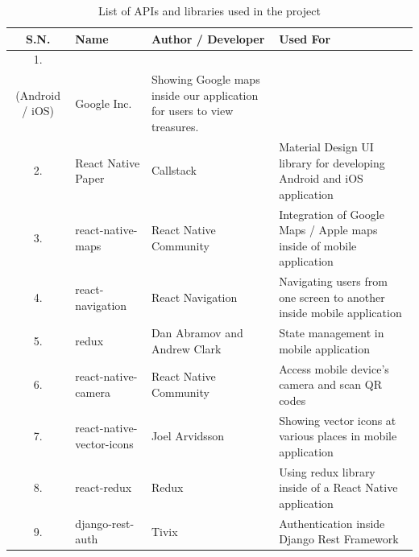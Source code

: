 \documentclass[12pt, a4paper, oneside]{article}
\begin{document}
\begin{table}[H]
\begin{tabularx}{\linewidth}{|c|X|X|X|}
\hline
\rowcolor[HTML]{C0C0C0} 
{\color[HTML]{000000} S.N.} & {\color[HTML]{000000} Name}                                               & {\color[HTML]{000000} Author / Developer} & {\color[HTML]{000000} Used For}                                         \\ \hline
1.                          & \begin{tabular}[c]{@{}l@{}}Google Maps SDK\\ (Android / iOS)\end{tabular} & Google Inc.                                            & Showing Google maps inside our application for users to view treasures. \\ \hline
2.                          & React Native Paper                                                        & Callstack                                              & Material Design UI library for developing Android and iOS application   \\ \hline
3.                          & react-native-maps                                                         & React Native Community                                 & Integration of Google Maps / Apple maps inside of mobile application    \\ \hline
4.                          & react-navigation                                                          & React Navigation                                       & Navigating users from one screen to another inside mobile application   \\ \hline
5.                          & redux                                                                     & Dan Abramov and Andrew Clark                           & State management in mobile application                                  \\ \hline
6.                          & react-native-camera                                                       & React Native Community                                 & Access mobile device's camera and scan QR codes                         \\ \hline
7.                          & react-native-vector-icons                                                 & Joel Arvidsson                                         & Showing vector icons at various places in mobile application            \\ \hline
8.                          & react-redux                                                               & Redux                                                  & Using redux library inside of a React Native application                \\ \hline
9.                          & django-rest-auth                                                              & Tivix                                                  & Authentication inside Django Rest Framework                \\ \hline
\end{tabularx}
\caption{List of APIs and libraries used in the project}
\label{table:apiandlibrary}
\end{table}
\end{document}
